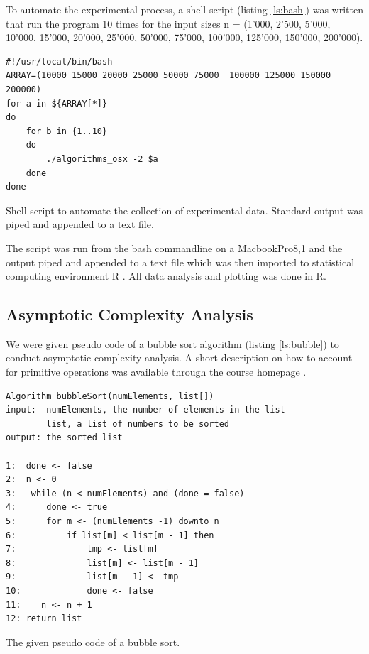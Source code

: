 \documentclass[a4paper,11pt,twoside]{article}
\begin{document}
To automate the experimental process, a shell script (listing \ref{ls:bash}) 
was written that run the program 10 times for the input sizes n = (1'000, 
2'500, 5'000, 10'000, 15'000, 20'000, 25'000, 50'000, 75'000, 100'000,
125'000, 150'000, 200'000).

\begin{listing}

\begin{verbatim}
#!/usr/local/bin/bash                                                                                           
ARRAY=(10000 15000 20000 25000 50000 75000  100000 125000 150000 200000)
for a in ${ARRAY[*]}
do
    for b in {1..10}
    do
        ./algorithms_osx -2 $a
    done
done
\end{verbatim}
\caption{Shell script to automate the collection of experimental
  data. Standard output was piped and appended to a text file.\label{ls:bash}}
\end{listing}

The script was run from the bash commandline on a MacbookPro8,1 and
the output piped and appended to a text file which was then imported
to statistical computing environment R \cite{rlanguage}. All data analysis and
plotting was done in R. 


\subsection{Asymptotic Complexity Analysis}
We were given pseudo code of a bubble sort algorithm (listing \ref{ls:bubble})
to conduct asymptotic complexity analysis. A short description on how
to account for primitive operations was available through the course
homepage \cite{complex}.

\begin{listing}
\begin{verbatim}
Algorithm bubbleSort(numElements, list[])
input:  numElements, the number of elements in the list
        list, a list of numbers to be sorted
output: the sorted list

1:  done <- false
2:  n <- 0
3:   while (n < numElements) and (done = false)
4:      done <- true
5:      for m <- (numElements -1) downto n
6:          if list[m] < list[m - 1] then
7:              tmp <- list[m]
8:              list[m] <- list[m - 1]
9:              list[m - 1] <- tmp
10:             done <- false
11:    n <- n + 1
12: return list 
\end{verbatim}
\caption{The given pseudo code of a bubble sort.}
\end{listing}
\end{document}
